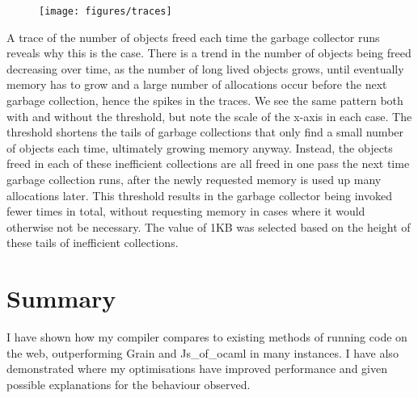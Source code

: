 \begin{figure}[H]
\hfill \texttt{[image: figures/traces]} \hfill
 \label{fig:traces} 
\end{figure}
A trace of the number of objects freed each time the garbage collector runs reveals why this is the case. There is a trend in the number of objects being freed decreasing over time, as the number of long lived objects grows, until eventually memory has to grow and a large number of allocations occur before the next garbage collection, hence the spikes in the traces. We see the same pattern both with and without the threshold, but note the scale of the x-axis in each case. The threshold shortens the tails of garbage collections that only find a small number of objects each time, ultimately growing memory anyway. Instead, the objects freed in each of these inefficient collections are all freed in one pass the next time garbage collection runs, after the newly requested memory is used up many allocations later. This threshold results in the garbage collector being invoked fewer times in total, without requesting memory in cases where it would otherwise not be necessary. The value of 1KB was selected based on the height of these tails of inefficient collections.

\section{Summary}
I have shown how my compiler compares to existing methods of running code on the web, outperforming Grain and Js\_of\_ocaml in many instances. I have also demonstrated where my optimisations have improved performance and given possible explanations for the behaviour observed.












